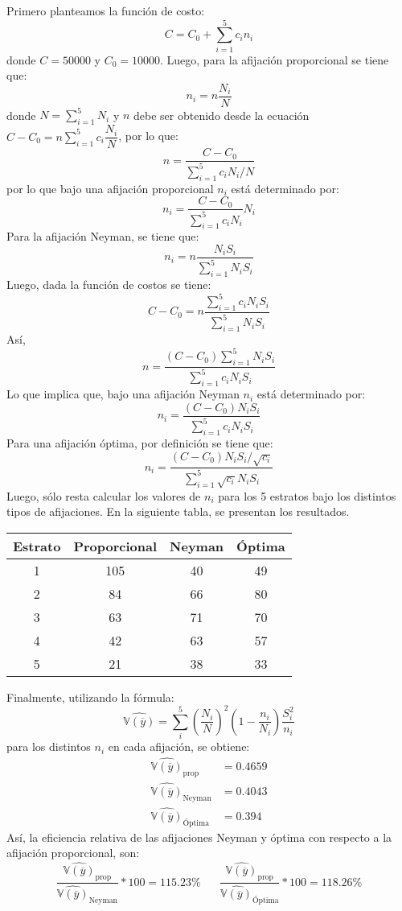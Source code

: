 \begin{solution}
Primero planteamos la función de costo:
$$C=C_0+\sum_{i=1}^{5}c_i n_i$$
donde $C=50000$ y $C_0=10000$. Luego, para la afijación proporcional se tiene que:
$$n_i=n\dfrac{N_i}{N}$$
donde $N=\sum_{i=1}^{5}N_i$ y $n$ debe ser obtenido desde la ecuación $C-C_0=n\sum_{i=1}^{5}c_i \dfrac{N_i}{N}$, por lo que:
$$n=\dfrac{C-C_0}{\sum_{i=1}^{5} c_i N_i/N}$$
por lo que bajo una afijación proporcional $n_i$ está determinado por:
$$n_i=\dfrac{C-C_0}{\sum_{i=1}^{5} c_i N_i}N_i$$
Para la afijación Neyman, se tiene que:
$$n_i=n\dfrac{N_i S_i}{\sum_{i=1}^{5}N_i S_i}$$
Luego, dada la función de costos se tiene:
$$C-C_0=n\dfrac{\sum_{i=1}^{5}c_i N_i S_i}{\sum_{i=1}^{5}N_i S_i}$$
Así, 
$$n=\dfrac{(C-C_0)\sum_{i=1}^{5} N_i S_i}{\sum_{i=1}^{5}c_i N_i S_i}$$
Lo que implica que, bajo una afijación Neyman $n_i$ está determinado por:
$$n_i=\dfrac{(C-C_0)N_i S_i}{\sum_{i=1}^{5} c_i N_i S_i}$$
Para una afijación óptima, por definición se tiene que:
$$n_i=\dfrac{(C-C_0)N_i S_i /\sqrt{c_i}}{\sum_{i=1}^{5} \sqrt{c_i}N_i S_i}$$
Luego, sólo resta calcular los valores de $n_i$ para los 5 estratos bajo los distintos tipos de afijaciones. En la siguiente tabla, se presentan los resultados.
\begin{center}
\begin{tabular}{cccc}
Estrato & Proporcional & Neyman & Óptima \\ 
\hline 
1 & 105 & 40 & 49 \\ 

2 & 84 & 66 & 80 \\ 
 
3 & 63 & 71 & 70 \\ 

4 & 42 & 63 & 57 \\ 

5 & 21 & 38 & 33 \\ 
 \end{tabular} 
\end{center}
Finalmente, utilizando la fórmula:
$$\widehat{\mathbb{V}(\overline{y})}=\sum_{i}^{5} \left(\dfrac{N_i}{N}\right)^2\left(1-\dfrac{n_i}{N_i}\right)\dfrac{S_{i}^{2}}{n_i}$$
para los distintos $n_i$ en cada afijación, se obtiene:
\begin{align*}
\widehat{\mathbb{V}(\overline{y})}_{\text{prop}}&=0.4659\\
\widehat{\mathbb{V}(\overline{y})}_{\text{Neyman}}&=0.4043\\
\widehat{\mathbb{V}(\overline{y})}_{\text{Óptima}}&=0.394
\end{align*}
Así, la eficiencia relativa de las afijaciones Neyman y óptima con respecto a la afijación proporcional, son:
$$\dfrac{\widehat{\mathbb{V}(\overline{y})}_{\text{prop}}}{\widehat{\mathbb{V}(\overline{y})}_{\text{Neyman}}}*100=115.23\% \hspace{20pt} \dfrac{\widehat{\mathbb{V}(\overline{y})}_{\text{prop}}}{\widehat{\mathbb{V}(\overline{y})}_{\text{Óptima}}}*100=118.26\% $$ 
\end{solution}